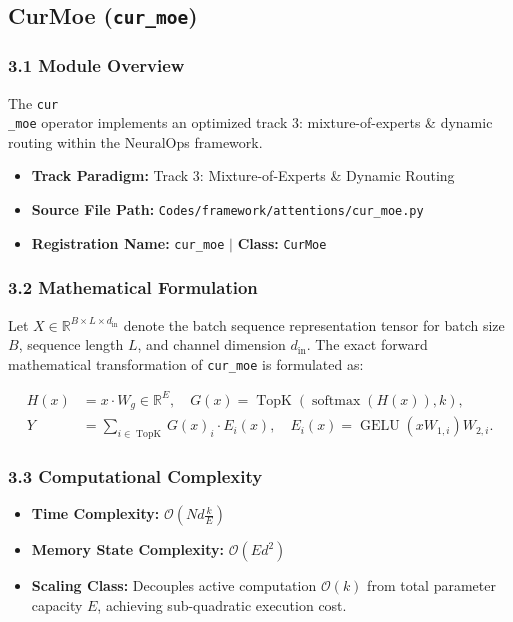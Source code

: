 \subsection{CurMoe (\texttt{cur\_moe})}
\label{sec:app_module_cur\_moe}

\subsubsection*{3.1 Module Overview}
The \texttt{cur\\_moe} operator implements an optimized track 3: mixture-of-experts \& dynamic routing within the NeuralOps framework.
\begin{itemize}
    \item \textbf{Track Paradigm:} Track 3: Mixture-of-Experts & Dynamic Routing
    \item \textbf{Source File Path:} \texttt{Codes/framework/attentions/cur\_moe.py}
    \item \textbf{Registration Name:} \texttt{cur\_moe} $\mid$ \textbf{Class:} \texttt{CurMoe}
\end{itemize}

\subsubsection*{3.2 Mathematical Formulation}
Let $X \in \mathbb{R}^{B \times L \times d_{\text{in}}}$ denote the batch sequence representation tensor for batch size $B$, sequence length $L$, and channel dimension $d_{\text{in}}$. The exact forward mathematical transformation of \texttt{cur\_moe} is formulated as:

\begin{align}
H(x) &= x \cdot W_g \in \mathbb{R}^{E}, \quad G(x) = \operatorname{TopK}\left(\operatorname{softmax}(H(x)), k\right), \\
Y &= \sum_{i \in \operatorname{TopK}} G(x)_i \cdot E_i(x), \quad E_i(x) = \operatorname{GELU}(x W_{1, i}) W_{2, i}.
\end{align}


\subsubsection*{3.3 Computational Complexity}
\begin{itemize}
    \item \textbf{Time Complexity:} $\mathcal{O}(N d \frac{k}{E})$
    \item \textbf{Memory State Complexity:} $\mathcal{O}(E d^2)$
    \item \textbf{Scaling Class:} Decouples active computation $\mathcal{O}(k)$ from total parameter capacity $E$, achieving sub-quadratic execution cost.
\end{itemize}

